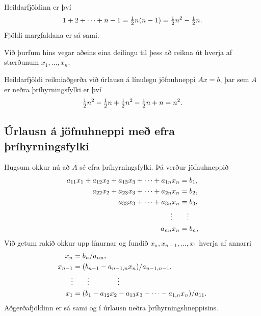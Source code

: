 \documentclass[letterpaper,10pt,icelandic]{sphinxmanual}
\begin{document}
Heildarfjöldinn er því
\begin{gather}
\begin{split}1 + 2 + \cdots + n-1 = \tfrac 12 n(n-1) =
    \tfrac 12n^2-\tfrac 12 n.\end{split}\notag
\end{gather}
Fjöldi margfaldana er sá sami.

Við þurfum hins vegar aðeins eina deilingu til þess að reikna út hverja
af stærðunum \(x_1,\dots,x_n\).

Heildarfjöldi reikniaðgerða við úrlausn á línulegu jöfnuhneppi
\(Ax=b\), þar sem \(A\) er neðra þríhyrningsfylki er því
\begin{gather}
\begin{split}\tfrac 12 n^2 - \tfrac 12 n
+ \tfrac 12 n^2 - \tfrac 12 n +n = n^2.\end{split}\notag
\end{gather}

\subsection{Úrlausn á jöfnuhneppi með efra þríhyrningsfylki}
\label{kafli08:urlausn-a-jofnuhneppi-me-efra-rihyrningsfylki}
Hugsum okkur nú að \(A\) sé efra þríhyrningsfylki. Þá verður
jöfnuhneppið
\begin{gather}
\begin{split}\begin{aligned}
    a_{11}x_1+a_{12}x_2+a_{13}x_3+\cdots+a_{1n}x_n& = b_1,\\
    a_{22}x_2+a_{23}x_3+\cdots+a_{2n}x_n& = b_2,\\
    a_{33}x_3+\cdots+a_{3n}x_n& = b_3,\\
    \vdots\quad& \quad \vdots\\
    a_{nn}x_n& = b_n,\end{aligned}\end{split}\notag
\end{gather}
Við getum rakið okkur upp línurnar og fundið
\(x_n,x_{n-1},\dots,x_1\) hverja af annarri
\begin{gather}
\begin{split}\begin{aligned}
    x_n& = b_n/a_{nn},\\
    x_{n-1}& = (b_{n-1}-a_{n-1,n}x_n)/a_{n-1,n-1},\\
    \vdots&\qquad \vdots\qquad \qquad \vdots\\
    x_1& = (b_1-a_{12}x_2-a_{13}x_3-\cdots
    -a_{1,n}x_{n})/a_{11}.\end{aligned}\end{split}\notag
\end{gather}
Aðgerðafjöldinn er sá sami og í úrlausn neðra þríhyrningshneppisins.
\end{document}
